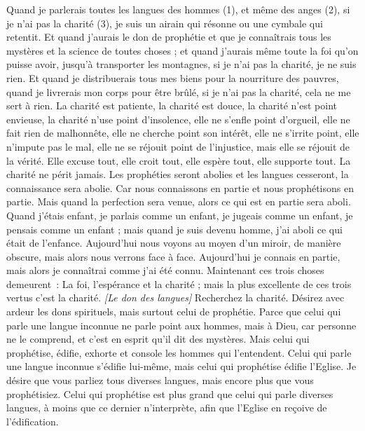 \begin{multicols}{2}
\VerseOne{}Quand je parlerais toutes les langues des hommes (1), et même des anges (2), si je n'ai pas la charité (3), je suis un airain qui résonne ou une cymbale qui retentit.
Et quand j'aurais le don de prophétie et que je connaîtrais tous les mystères et la science de toutes choses ; et quand j'aurais même toute la foi qu'on puisse avoir, jusqu’à transporter les montagnes, si je n'ai pas la charité, je ne suis rien.
Et quand je distribuerais tous mes biens pour la nourriture des pauvres, quand je livrerais mon corps pour être brûlé, si je n'ai pas la charité, cela ne me sert à rien.
La charité est patiente, la charité est douce, la charité n'est point envieuse, la charité n'use point d'insolence, elle ne s’enfle point d’orgueil,
elle ne fait rien de malhonnête, elle ne cherche point son intérêt, elle ne s’irrite point, elle n’impute pas le mal,
elle ne se réjouit point de l'injustice, mais elle se réjouit de la vérité.
Elle excuse tout, elle croit tout, elle espère tout, elle supporte tout.
La charité ne périt jamais. Les prophéties seront abolies et les langues cesseront, la connaissance sera abolie.
Car nous connaissons en partie et nous prophétisons en partie.
Mais quand la perfection sera venue, alors ce qui est en partie sera aboli.
Quand j'étais enfant, je parlais comme un enfant, je jugeais comme un enfant, je pensais comme un enfant ; mais quand je suis devenu homme, j'ai aboli ce qui était de l'enfance.
Aujourd’hui nous voyons au moyen d’un miroir, de manière obscure, mais alors nous verrons face à face. Aujourd’hui je connais en partie, mais alors je connaîtrai comme j'ai été connu.
Maintenant ces trois choses demeurent : La foi, l'espérance et la charité ; mais la plus excellente de ces trois vertus c'est la charité.
\textit{[Le don des langues]}
\VerseOne{}Recherchez la charité. Désirez avec ardeur les dons spirituels, mais surtout celui de prophétie.
Parce que celui qui parle une langue inconnue ne parle point aux hommes, mais à Dieu, car personne ne le comprend, et c’est en esprit qu’il dit des mystères.
Mais celui qui prophétise, édifie, exhorte et console les hommes qui l'entendent.
Celui qui parle une langue inconnue s'édifie lui-même, mais celui qui prophétise édifie l'Eglise.
Je désire que vous parliez tous diverses langues, mais encore plus que vous prophétisiez. Celui qui prophétise est plus grand que celui qui parle diverses langues, à moins que ce dernier n’interprète, afin que l'Eglise en reçoive de l'édification.

\end{multicols}
